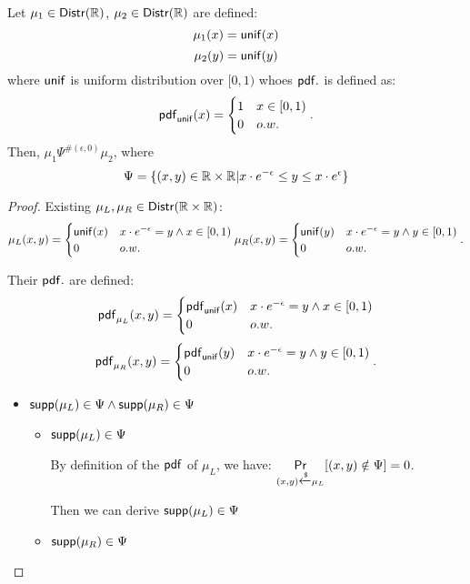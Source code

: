 \documentclass{article}
\begin{document}
\begin{thm}
Let $\mu_1 \in \mathsf{Distr}(\mathbb{R})$, $\mu_2 \in \mathsf{Distr}(\mathbb{R})$ are defined:
\[
	{\mu_1}(x) = \mathsf{unif}(x)
\]
\[
	{\mu_2}(y) = {\mathsf{unif}}(y)
\]
where $\mathsf{unif}$ is uniform distribution over $[0, 1)$ whoes $\mathsf{pdf}.$ is defined as:
\[
	\mathsf{pdf}_{\mathsf{unif}}(x) = 
	\begin{cases}
	1 & x \in [0, 1)\\
	0       & o.w.
	\end{cases}.
\]
Then, $\mu_1 \Psi^{\#(\epsilon, 0)} \mu_2$, where
\[
	\Psi = \{(x,y) \in \mathbb{R} \times \mathbb{R} | x \cdot e^{-\epsilon} \leq y \leq x \cdot e^{\epsilon} \}
\]
\end{thm}
\begin{proof}
Existing $\mu_L, \mu_R \in \mathsf{Distr}(\mathbb{R} \times \mathbb{R})$:
\[
	{\mu_L}(x, y) = 
	\begin{cases}
	{\mathsf{unif}}(x) & x \cdot e^{-\epsilon} = y \land x \in [0, 1)\\
	0       & o.w.
	\end{cases}
	\\
	{\mu_R}(x, y) = 
	\begin{cases}
	{\mathsf{unif}}(y) & x \cdot e^{-\epsilon} = y \land y \in [0, 1)\\
	0       & o.w.
	\end{cases}.
\]


Their $\mathsf{pdf}.$ are defined:
\[
	\mathsf{pdf}_{\mu_L}(x, y) = 
	\begin{cases}
	\mathsf{pdf}_{\mathsf{unif}}(x) & x \cdot e^{-\epsilon} = y \land x \in [0, 1)\\
	0       & o.w.
	\end{cases}
\]
\[
	\mathsf{pdf}_{\mu_R}(x, y) = 
	\begin{cases}
	\mathsf{pdf}_{\mathsf{unif}}(y) & x \cdot e^{-\epsilon} = y \land y \in [0, 1)\\
	0       & o.w.
	\end{cases}.
\]
\begin{itemize}
	\item $\mathsf{supp}(\mu_L) \in \Psi \land \mathsf{supp}(\mu_R) \in \Psi$

	\begin{itemize}
		\item $\mathsf{supp}(\mu_L) \in \Psi$ 

		By definition of the $\mathsf{pdf}$ of $\mu_L$, we have: $\underset{(x,y) \xleftarrow{\$} \mu_L}{\mathsf{Pr}}[(x,y) \notin \Psi] = 0$.

		Then we can derive $\mathsf{supp}(\mu_L) \in \Psi$

		\item $\mathsf{supp}(\mu_R) \in \Psi$


\end{itemize}
\end{itemize}
\end{proof}
\end{document}
